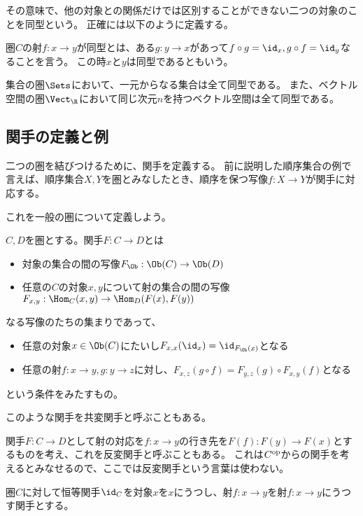 \documentclass[uplatex]{jsarticle}
\begin{document}
その意味で、他の対象との関係だけでは区別することができない二つの対象のことを同型という。
正確には以下のように定義する。

\begin{dfn}
圏$C$の射$f:x\to y$が同型とは、ある$g:y\to x$があって$f\circ g=\id_x, g\circ f=\id_y$なることを言う。
この時$x$と$y$は同型であるともいう。
\end{dfn}

\begin{eg}
集合の圏$\Sets$において、一元からなる集合は全て同型である。
また、ベクトル空間の圏$\Vect_\R$において同じ次元$n$を持つベクトル空間は全て同型である。
\end{eg}

\subsection{関手の定義と例}
二つの圏を結びつけるために、関手を定義する。
前に説明した順序集合の例で言えば、順序集合$X, Y$を圏とみなしたとき、順序を保つ写像$f:X \to Y$が関手に対応する。

これを一般の圏について定義しよう。

\begin{dfn}[関手]
$C, D$を圏とする。関手$F:C\to D$とは
\begin{itemize}
\item 対象の集合の間の写像$F_{\Ob}:\Ob(C)\to \Ob(D)$
\item 任意の$C$の対象$x,y$について射の集合の間の写像$F_{x,y}:\Hom_C(x,y)\to \Hom_D(F(x),F(y))$
\end{itemize}
なる写像のたちの集まりであって、
\begin{itemize}
\item 任意の対象$x\in\Ob(C)$にたいし$F_{x,x}(\id_x)=\id_{F_{\Ob}(x)}$となる
\item 任意の射$f:x\to y, g:y\to z$に対し、$F_{x,z}(g\circ f)=F_{y,z}(g)\circ F_{x,y}(f)$となる
\end{itemize}
という条件をみたすもの。
\end{dfn}

このような関手を共変関手と呼ぶこともある。

\begin{rem}
関手$F:C\to D$として射の対応を$f:x\to y$の行き先を$F(f):F(y)\to F(x)$とするものを考え、これを反変関手と呼ぶこともある。
これは$C^{\rm op}$からの関手を考えるとみなせるので、ここでは反変関手という言葉は使わない。
\end{rem}

\begin{eg}
圏$C$に対して恒等関手$\id_C$を対象$x$を$x$にうつし、射$f:x \to y$を射$f:x \to y$にうつす関手とする。
\end{eg}
\end{document}
